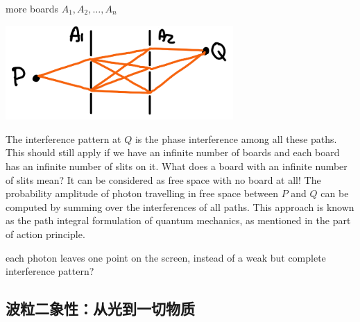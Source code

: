 {{{{                \item more boards $A_1, A_2, \ldots, A_n$
                \newline
                \begin{center}\includegraphics[width=0.65\textwidth]{dspi2}\end{center}
            }
            The interference pattern at $Q$ is the phase interference among all these paths. This should still apply if we have an infinite number of boards and each board has an infinite number of slits on it.
            \tcblower
            What does a board with an infinite number of slits mean? It can be considered as free space with no board at all! The probability amplitude of photon travelling in free space between $P$ and $Q$ can be computed by summing over the interferences of all paths. This approach is known as the path integral formulation of quantum mechanics, as mentioned in the part of action principle.
        }
        each photon leaves one point on the screen, instead of a weak but complete interference pattern?
    }
}

\subsection{波粒二象性：从光到一切物质}


